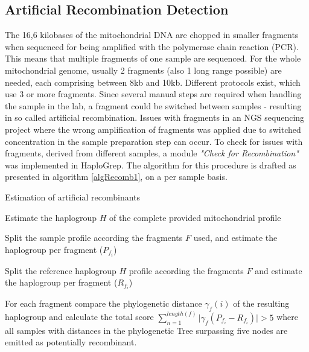 \subsection{Artificial Recombination Detection}
The 16,6 kilobases of the mitochondrial DNA are chopped in smaller fragments when sequenced for being amplified with the polymerase chain reaction (PCR). This means that multiple fragments of one sample are sequenced. For the whole mitochondrial genome, usually 2 fragments (also 1 long range possible) are needed, each comprising between 8kb and 10kb. Different protocols exist, which use 3 or more fragments. Since several manual steps are required when handling the sample in the lab, a fragment could be switched between samples - resulting in so called artificial recombination. Issues with fragments in an NGS sequencing project where the wrong amplification of fragments was applied due to switched concentration in the sample preparation step can occur.
To check for issues with fragments, derived from different samples, a module \textit{"Check for Recombination"} was implemented in HaploGrep. The algorithm for this procedure is  drafted as presented in algorithm \ref{algRecomb1}, on a per sample basis.
\begin{algorithm}
  \caption{Estimation of artificial recombinants}
  \label{algRecomb1}

Estimate the haplogroup $H$ of the complete provided mitochondrial profile 

Split the sample profile according the fragments $F$ used, and estimate the haplogroup per fragment ($P_{f_i}$)

Split the reference haplogroup $H$ profile according the fragments $F$ and estimate the haplogroup per fragment ($R_{f_i}$)
	
For each fragment compare the phylogenetic distance $\gamma_f(i)$ of the resulting haplogroup and calculate the total score 
$\sum_{n=1}^{length(f)} |{\gamma_f(P_{f_i} - R_{f_i})| > 5}$ 
where all samples with distances in the phylogenetic Tree surpassing five nodes are emitted as potentially recombinant.
\end{algorithm}


